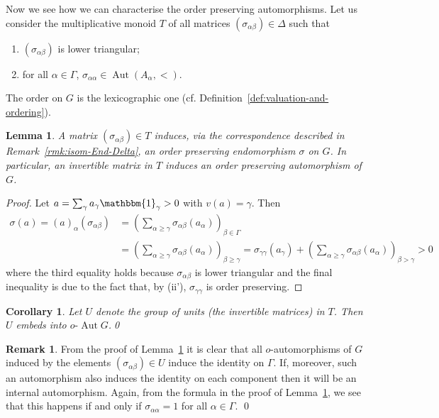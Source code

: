 \documentclass[12pt,a4paper,reqno,openright]{amsart}
\renewcommand{\1}{\mathbbm{1}}
\DeclareMathOperator{\Aut}{Aut}
\newcommand{\oAut}{o\text{-}\Aut}
\theoremstyle{definition}
\theoremstyle{plain}
\newtheorem{lemma}[defn]{Lemma}
\theoremstyle{plain}
\theoremstyle{plain}
\theoremstyle{plain}
\theoremstyle{plain}
\theoremstyle{plain}
\theoremstyle{plain}
\newtheorem{cor}[defn]{Corollary}
\theoremstyle{plain}
\theoremstyle{definition}
\theoremstyle{definition}
\theoremstyle{plain}
\theoremstyle{definition}
\theoremstyle{definition}
\newtheorem{rmk}[defn]{Remark}
\theoremstyle{plain}
\theoremstyle{plain}
\theoremstyle{plain}
\begin{document}
Now we see how we can characterise the order preserving automorphisms.
Let us consider the multiplicative monoid $ T $ of all matrices $ (\sigma_{\alpha\beta}) \in\Delta $ such that
\begin{enumerate}[(i')]
	\item $ (\sigma_{\alpha\beta}) $ is lower triangular;
	\item for all $ \alpha\in\Gamma $, $ \sigma_{\alpha\alpha}\in \Aut (A_\alpha,<) $.
\end{enumerate}
The order on $ G $ is the lexicographic one (cf. Definition~\ref{def:valuation-and-ordering}).
\begin{lemma}\label{lemma:conrad-lemma0}
A matrix $ (\sigma_{\alpha\beta})\in T $ induces, via the correspondence described in Remark~\ref{rmk:isom-End-Delta}, an order preserving endomorphism $ \sigma $ on $ G $.
In particular, an invertible matrix in $ T $ induces an order preserving automorphism of $ G $.
\end{lemma}
\begin{proof}
Let $ a = \sum_\gamma a_\gamma\1_\gamma >0 $ with $ v(a)=\gamma $. Then
\begin{align*}
\sigma(a) = (a)_\alpha(\sigma_{\alpha\beta}) &= \left(\sum_{\alpha\geq\gamma}\sigma_{\alpha\beta}(a_\alpha) \right)_{\beta\in\Gamma} \\&= \left(\sum_{\alpha\geq\gamma}\sigma_{\alpha\beta}(a_\alpha) \right)_{\beta\geq\gamma} = \sigma_{\gamma\gamma}(a_\gamma)+\left(\sum_{\alpha\geq\gamma}\sigma_{\alpha\beta}(a_\alpha) \right)_{\beta>\gamma}>0
\end{align*}
where the third equality holds because $ \sigma_{\alpha\beta} $ is lower triangular and the final inequality is due to the fact that, by (ii'), $ \sigma_{\gamma\gamma} $ is order preserving.
\end{proof}
\begin{cor}\label{cor:conrad-lemma0}
	Let $ U $ denote the group of units (the invertible matrices) in $ T $.
	Then $ U $ embeds into $ \oAut G $.\qed
\end{cor}
\begin{rmk}
From the proof of Lemma~\ref{lemma:conrad-lemma0} it is clear that all $ o $-automorphisms of $ G $ induced by the elements $ (\sigma_{\alpha\beta})\in U $ induce the identity on $ \Gamma $. If, moreover, such an automorphism also induces the identity on each component then it will be an internal automorphism. Again, from the formula in the proof of Lemma~\ref{lemma:conrad-lemma0}, we see that this happens if and only if $ \sigma_{\alpha\alpha}=1 $ for all $ \alpha\in\Gamma $.
\qed
\end{rmk}
\end{document}
